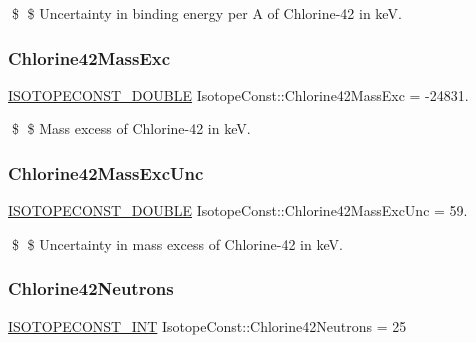\$ \$ Uncertainty in binding energy per A of Chlorine-\/42 in keV. \mbox{\label{group___isotope_const-_chlorine-_cl42_gafc6d9350f8bde3455ecba6be2320d0e1}} 
\subsubsection{\texorpdfstring{Chlorine42\+Mass\+Exc}{Chlorine42MassExc}}
{\footnotesize\ttfamily \mbox{\hyperlink{group___isotope_const-_macros_ga8f45a7272ce02c0b4c65c44636ed719a}{I\+S\+O\+T\+O\+P\+E\+C\+O\+N\+S\+T\+\_\+\+D\+O\+U\+B\+LE}} Isotope\+Const\+::\+Chlorine42\+Mass\+Exc = -\/24831.}

\$ \$ Mass excess of Chlorine-\/42 in keV. \mbox{\label{group___isotope_const-_chlorine-_cl42_gaa442c0fe7d51e18fcbe96dbe861ae334}} 
\subsubsection{\texorpdfstring{Chlorine42\+Mass\+Exc\+Unc}{Chlorine42MassExcUnc}}
{\footnotesize\ttfamily \mbox{\hyperlink{group___isotope_const-_macros_ga8f45a7272ce02c0b4c65c44636ed719a}{I\+S\+O\+T\+O\+P\+E\+C\+O\+N\+S\+T\+\_\+\+D\+O\+U\+B\+LE}} Isotope\+Const\+::\+Chlorine42\+Mass\+Exc\+Unc = 59.}

\$ \$ Uncertainty in mass excess of Chlorine-\/42 in keV. \mbox{\label{group___isotope_const-_chlorine-_cl42_gaf064567a239ce0813ed452f08431175b}} 
\subsubsection{\texorpdfstring{Chlorine42\+Neutrons}{Chlorine42Neutrons}}
{\footnotesize\ttfamily \mbox{\hyperlink{group___isotope_const-_macros_ga5f18360b3e99483a35c32d789e62621c}{I\+S\+O\+T\+O\+P\+E\+C\+O\+N\+S\+T\+\_\+\+I\+NT}} Isotope\+Const\+::\+Chlorine42\+Neutrons = 25}

